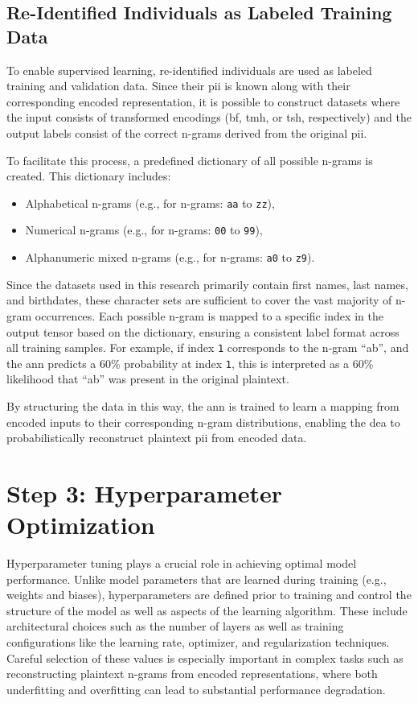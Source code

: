 \subsection{Re-Identified Individuals as Labeled Training Data}

To enable supervised learning, re-identified individuals are used as labeled training and validation data.
Since their \ac{pii} is known along with their corresponding encoded representation, it is possible to construct datasets where the input consists of transformed encodings (\ac{bf}, \ac{tmh}, or \ac{tsh}, respectively) and the output labels consist of the correct n-grams derived from the original \ac{pii}.

To facilitate this process, a predefined dictionary of all possible n-grams is created. This dictionary includes:
\begin{itemize}
   \item Alphabetical n-grams (e.g., for n-grams: \texttt{aa} to \texttt{zz}),
   \item Numerical n-grams (e.g., for n-grams: \texttt{00} to \texttt{99}),
   \item Alphanumeric mixed n-grams (e.g., for n-grams: \texttt{a0} to \texttt{z9}).
\end{itemize}

Since the datasets used in this research primarily contain first names, last names, and birthdates, these character sets are sufficient to cover the vast majority of n-gram occurrences.
Each possible n-gram is mapped to a specific index in the output tensor based on the dictionary, ensuring a consistent label format across all training samples.
For example, if index \texttt{1} corresponds to the n-gram \enquote{ab}, and the \ac{ann} predicts a 60\% probability at index \texttt{1}, this is interpreted as a 60\% likelihood that \enquote{ab} was present in the original plaintext.

By structuring the data in this way, the \ac{ann} is trained to learn a mapping from encoded inputs to their corresponding n-gram distributions, enabling the \ac{dea} to probabilistically reconstruct plaintext \ac{pii} from encoded data.

\section{Step 3: Hyperparameter Optimization} \label{sec:hmo}

Hyperparameter tuning plays a crucial role in achieving optimal model performance.
Unlike model parameters that are learned during training (e.g., weights and biases), hyperparameters are defined prior to training and control the structure of the model as well as aspects of the learning algorithm.
These include architectural choices such as the number of layers as well as training configurations like the learning rate, optimizer, and regularization techniques.
Careful selection of these values is especially important in complex tasks such as reconstructing plaintext n-grams from encoded representations, where both underfitting and overfitting can lead to substantial performance degradation.


